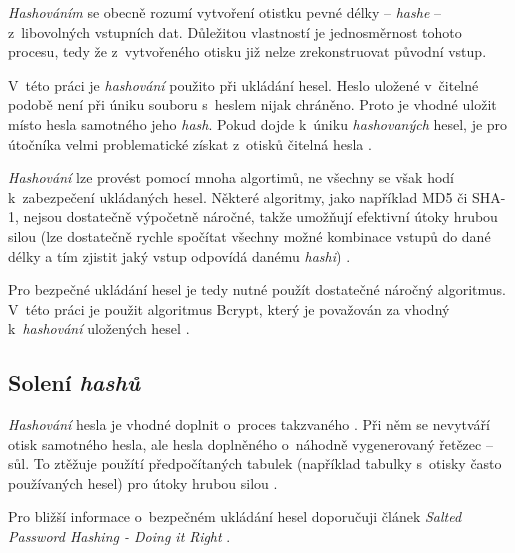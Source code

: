 \textit{Hashováním} se obecně rozumí vytvoření otistku pevné délky -- \textit{hashe} -- z~libovolných vstupních dat. Důležitou vlastností je jednosměrnost tohoto procesu, tedy že z~vytvořeného otisku již nelze zrekonstruovat původní vstup. \cite{hash_crackstation}

V~této práci je \textit{hashování} použito při ukládání hesel. Heslo uložené v~čitelné podobě není při úniku souboru s~heslem nijak chráněno. Proto je vhodné uložit místo hesla samotného jeho \textit{hash}. Pokud dojde k~úniku \textit{hashovaných} hesel, je pro útočníka velmi problematické  získat z~otisků čitelná hesla \cite{hash_crackstation}.

\textit{Hashování} lze provést pomocí mnoha algortimů, ne všechny se však hodí k~zabezpečení ukládaných hesel. Některé algoritmy, jako například MD5 či SHA-1, nejsou dostatečně výpočetně náročné, takže umožňují efektivní útoky hrubou silou (lze dostatečně rychle spočítat všechny možné kombinace vstupů do dané délky a tím zjistit jaký vstup odpovídá danému \textit{hashi}) \cite{hash_crackstation}. 

Pro bezpečné ukládání hesel je tedy nutné použít dostatečné náročný algoritmus. V~této práci je použit algoritmus Bcrypt, který je považován za vhodný k~\textit{hashování} uložených hesel \cite{hash_crackstation}.

\subsection{Solení \textit{hashů}}

\textit{Hashování} hesla je vhodné doplnit o~proces takzvaného . Při něm se nevytváří otisk samotného hesla, ale hesla doplněného o~náhodně vygenerovaný řetězec -- sůl. To ztěžuje použítí předpočítaných tabulek (například tabulky s~otisky často používaných hesel) pro útoky hrubou silou \cite{hash_crackstation}.

Pro bližší informace o~bezpečném ukládání hesel doporučuji článek \textit{Salted Password Hashing - Doing it Right} \cite{hash_crackstation}.
